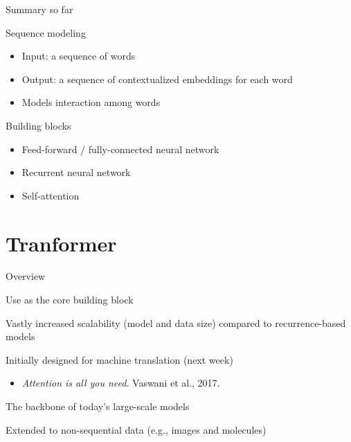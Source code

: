 \documentclass[usenames,dvipsnames,notes,11pt,aspectratio=169,hyperref={colorlinks=true, linkcolor=blue}]{beamer}
\begin{document}
\begin{frame}
    {Summary so far}
    \begin{wideitemize}
        \item Sequence modeling
            \begin{itemize}
                \item Input: a sequence of words
                \item Output: a sequence of contextualized embeddings for each word
                \item Models interaction among words
            \end{itemize}
            \pause
        \item Building blocks 
            \begin{itemize}
                \item Feed-forward / fully-connected neural network
                \item Recurrent neural network
                \item Self-attention
            \end{itemize}
            \pause
    \end{wideitemize}
\end{frame}

\section{Tranformer}

\begin{frame}
    {Overview}
    \begin{wideitemize}
        \item Use  as the core building block
        \item Vastly increased scalability (model and data size) compared to recurrence-based models
        \item Initially designed for machine translation (next week) 
            \begin{itemize}
                \item \textit{Attention is all you need}. Vaswani et al., 2017.
            \end{itemize}
        \item The backbone of today's large-scale models
        \item Extended to non-sequential data (e.g., images and molecules)
    \end{wideitemize}
\end{frame}
\end{document}
